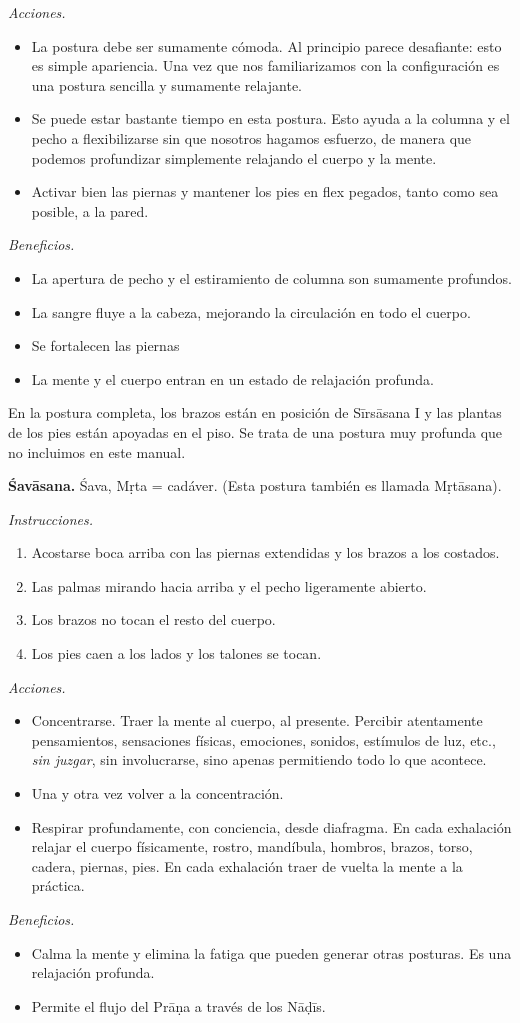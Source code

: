 \emph{Acciones.}
\begin{itemize}
\item La postura debe ser sumamente cómoda.
Al principio parece desafiante: esto es
simple apariencia. Una vez que nos
familiarizamos con la configuración es una
postura sencilla y sumamente relajante.
\item Se puede estar bastante tiempo en esta
postura. Esto ayuda a la columna y el pecho a
flexibilizarse sin que nosotros hagamos
esfuerzo, de manera que podemos profundizar
simplemente relajando el cuerpo y la mente.
\item Activar bien las piernas y mantener los
pies en flex pegados, tanto como sea posible,
a la pared.
\end{itemize}

\emph{Beneficios.}
\begin{itemize}
\item La apertura de pecho y el estiramiento
de columna son sumamente profundos.
\item La sangre fluye a la cabeza, mejorando
la circulación en todo el cuerpo.
\item Se fortalecen las piernas
\item La mente y el cuerpo entran en un
estado de relajación profunda.
\end{itemize}

En la postura completa, los brazos están en
posición de Sīrsāsana I y las plantas de los
pies están apoyadas en el piso. Se trata de
una postura muy profunda que no incluimos en
este manual.

\medskip\noindent\textbf{Śavāsana.}
Śava, Mṛta = cadáver. (Esta postura también
es llamada Mṛtāsana).

\emph{Instrucciones.}
\begin{enumerate}
\item Acostarse boca arriba con las piernas
extendidas y los brazos a los costados.
\item Las palmas mirando hacia arriba y el
pecho ligeramente abierto.
\item Los brazos no tocan el resto del
cuerpo.
\item Los pies caen a los lados y los talones
se tocan.
\end{enumerate}

\emph{Acciones.}
\begin{itemize}
\item Concentrarse. Traer la mente al cuerpo,
al presente. Percibir atentamente
pensamientos, sensaciones físicas, emociones,
sonidos, estímulos de luz, etc., \emph{sin
juzgar}, sin involucrarse, sino apenas
permitiendo todo lo que acontece.
\item Una y otra vez volver a la
concentración.
\item Respirar profundamente, con conciencia,
desde diafragma. En cada exhalación relajar
el cuerpo físicamente, rostro, mandíbula,
hombros, brazos, torso, cadera, piernas,
pies. En cada exhalación traer de vuelta la
mente a la práctica.
\end{itemize}

\emph{Beneficios.}
\begin{itemize}
\item Calma la mente y elimina la fatiga que
pueden generar otras posturas. Es una
relajación profunda.
\item Permite el flujo del Prāṇa a través de
los Nāḍīs.
\end{itemize}






